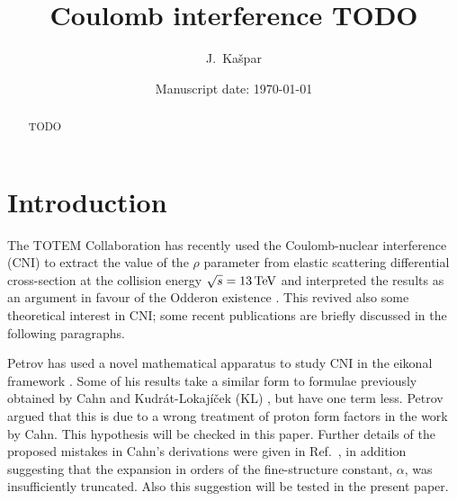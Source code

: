 \documentclass[pdftex,twocolumn,epjc3]{svjour3}
\def\un#1{\,{\rm #1}}
\begin{document}
\title{Coulomb interference TODO}


\author{
	J.~Ka\v spar
}



\date{Manuscript date: \today}

\maketitle

\begin{abstract}
TODO
\end{abstract}




\section{Introduction}
\label{sec:introduction}

The TOTEM Collaboration has recently used the Coulomb-nuclear interference (CNI) to extract the value of the $\rho$ parameter from elastic scattering differential cross-section at the collision energy $\sqrt s = 13\un{TeV}$ and interpreted the results as an argument in favour of the Odderon existence \cite{totem-13tev-rho}. This revived also some theoretical interest in CNI; some recent publications are briefly discussed in the following paragraphs.

Petrov has used a novel mathematical apparatus to study CNI in the eikonal framework \cite{petrov2018,petrov2018-erratum}. Some of his results take a similar form to formulae previously obtained by Cahn \cite{cahn82} and Kudr\'at-Lokaj\'i\v cek (KL) \cite{kl94}, but have one term less. Petrov argued that this is due to a wrong treatment of proton form factors in the work by Cahn. This hypothesis will be checked in this paper. Further details of the proposed mistakes in Cahn's derivations were given in Ref.~\cite{petrov2019}, in addition suggesting that the expansion in orders of the fine-structure constant, $\alpha$, was insufficiently truncated. Also this suggestion will be tested in the present paper.
\end{document}
